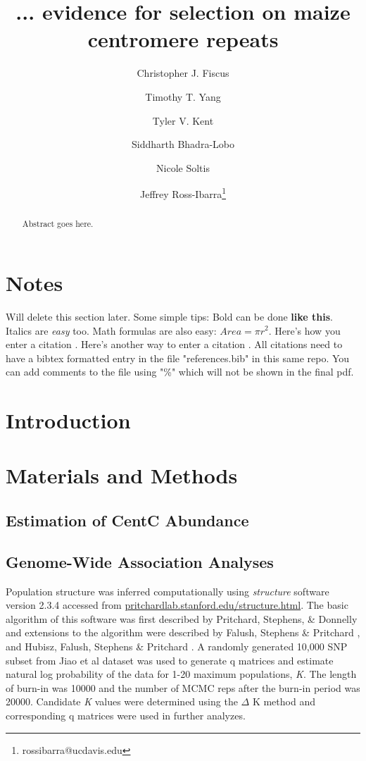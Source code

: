 \documentclass[12pt]{article}
\title{... evidence for selection on maize centromere repeats}
\author[1]{Christopher J. Fiscus}
\author[1]{Timothy T. Yang}
\author[1]{Tyler V. Kent}
\author[1]{Siddharth Bhadra-Lobo}
\author[1]{Nicole Soltis}
\author[1,2]{Jeffrey Ross-Ibarra\thanks{rossibarra@ucdavis.edu}}
\affil[1]{Department of Plant Sciences, University of California Davis}
\affil[2]{Center for Population Biology and Genome Center, University of California Davis}
\date{}
\begin{document}
\maketitle

\begin{abstract}
Abstract goes here.
\end{abstract}

\begin{footnotesize}
\end{footnotesize}

\section*{Notes}

Will delete this section later.  Some simple tips:
Bold can be done {\bf like this}.  Italics are \emph{easy} too.  Math formulas are also easy: $Area=\pi r^2$.
Here's how you enter a citation \cite{Wolfgruber2009}.
Here's another way to enter a citation \citep{Wolfgruber2009}.
All citations need to have a bibtex formatted entry in the file "references.bib" in this same repo. You can add comments to the file using "\%" which will not be shown in the final pdf.  

\section{Introduction}

\section{Materials and Methods}

\subsection{Estimation of CentC Abundance} %

\subsection{Genome-Wide Association Analyses} %
Population structure was inferred computationally using \emph{structure} software version 2.3.4 accessed from \url{pritchardlab.stanford.edu/structure.html}.  The basic algorithm of this software was first described by Pritchard, Stephens, \& Donnelly \cite{Pritchard2000} and extensions to the algorithm were described by Falush, Stephens \& Pritchard \cite{Falush2003}, \cite{Falush2007} and Hubisz, Falush, Stephens \& Pritchard \cite{Hubisz2009}. A randomly generated 10,000 SNP subset from Jiao et al dataset was used to generate q matrices and estimate natural log probability of the data for 1-20 maximum populations, \emph{K}.  The length of burn-in was 10000 and the number of MCMC reps after the burn-in period was 20000.  Candidate \emph{K} values were determined using the $\Delta$ K method and corresponding q matrices were used in further analyzes.    
\end{document}
